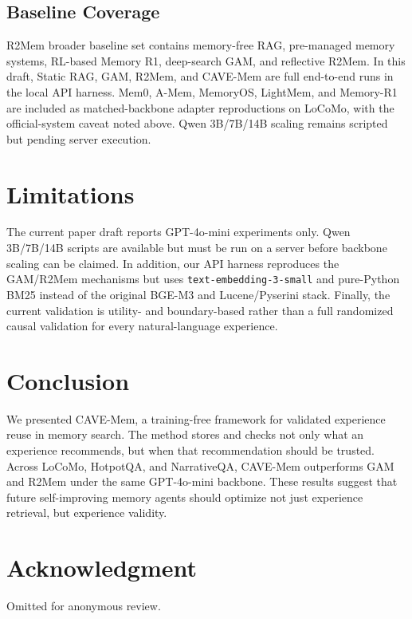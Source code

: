 \documentclass[conference]{IEEEtran}
\newcommand{\method}{CAVE-Mem}
\begin{document}
\subsection{Baseline Coverage}
R2Mem broader baseline set contains memory-free RAG, pre-managed memory
systems, RL-based Memory R1, deep-search GAM, and reflective R2Mem. In this
draft, Static RAG, GAM, R2Mem, and CAVE-Mem are full end-to-end runs in the
local API harness. Mem0, A-Mem, MemoryOS, LightMem, and Memory-R1 are included
as matched-backbone adapter reproductions on LoCoMo, with the official-system
caveat noted above. Qwen 3B/7B/14B scaling remains scripted but pending server
execution.

\section{Limitations}

The current paper draft reports GPT-4o-mini experiments only. Qwen 3B/7B/14B
scripts are available but must be run on a server before backbone scaling can
be claimed. In addition, our API harness reproduces the GAM/R2Mem mechanisms
but uses \texttt{text-embedding-3-small} and pure-Python BM25 instead of the
original BGE-M3 and Lucene/Pyserini stack. Finally, the current validation is
utility- and boundary-based rather than a full randomized causal validation for
every natural-language experience.

\section{Conclusion}

We presented \method{}, a training-free framework for validated experience
reuse in memory search. The method stores and checks not only what an
experience recommends, but when that recommendation should be trusted. Across
LoCoMo, HotpotQA, and NarrativeQA, \method{} outperforms GAM and R2Mem under
the same GPT-4o-mini backbone. These results suggest that future
self-improving memory agents should optimize not just experience retrieval, but
experience validity.

\section*{Acknowledgment}
Omitted for anonymous review.
\end{document}
